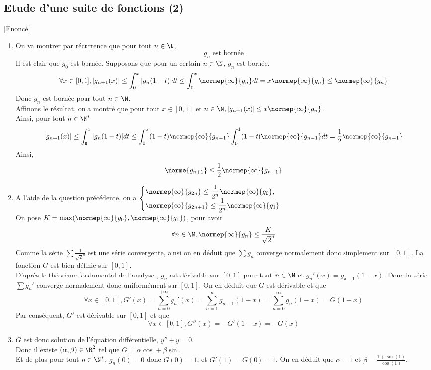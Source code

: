 \documentclass{book}
\begin{document}
	\subsection{Etude d'une suite de fonctions (2)}\label{sec:etude-dune-suite-de-fonction-2}
		\textcolor{blue}{\hyperref[Etude d'une suite de fonctions 2]{[Enoncé]}}\\
	\begin{enumerate}[leftmargin=*]
		\item On va montrer par récurrence que pour tout $n\in\N$, 
		\[g_n \text{ est bornée}\]
		Il est clair que $g_0$ est bornée.
		Supposons que pour un certain $n\in\N$, $g_n$ est bornée.\\
		\[\forall x\in [0,1], |g_{n+1}(x)|\leq\int_{0}^{x}|g_{n}(1-t)|dt\leq\int_{0}^{x}\normep{\infty}{g_n}dt=x\normep{\infty}{g_n}\leq \normep{\infty}{g_n}\]
		Donc $g_n$ est bornée pour tout $n\in \N$.\\
		Affinons le résultat, on a montré que pour tout $x\in [0,1]$ et $n\in\N, |g_{n+1}(x)|\leq x\normep{\infty}{g_n}$.\\
		Ainsi, pour tout $n\in\N^*$
		\[|g_{n+1}(x)|\leq\int_{0}^{x}|g_n(1-t)|dt\leq\int_{0}^{x}(1-t)\normep{\infty}{g_{n-1}}\int_{0}^{1}(1-t)\normep{\infty}{g_{n-1}}dt=\frac{1}{2}\normep{\infty}{g_{n-1}}\]
		Ainsi, \[\norme{g_{n+1}}\leq \frac{1}{2}\normep{\infty}{g_{n-1}}\]
		\item A l'aide de la question précédente, on a $\begin{cases}
		\displaystyle	\normep{\infty}{g_{2n}}\leq \frac{1}{2^n}\normep{\infty}{g_0},\\
		\displaystyle 	\normep{\infty}{g_{2n+1}}\leq \frac{1}{2^n}\normep{\infty}{g_1}
		\end{cases}$\\
		On pose $K=\max(\normep{\infty}{g_0}, \normep{\infty}{g_1})$, pour avoir \[\forall n\in\N, \normep{\infty}{g_n}\leq\frac{K}{\sqrt{2}^n}\]
		Comme la série $\displaystyle\sum \frac{1}{\sqrt{2}^n}$ est une série convergente, ainsi on en déduit que $\displaystyle\sum g_n$ converge normalement donc simplement sur $[0,1]$. La fonction $G$ est bien définie sur $[0,1]$.\\
		D'après le théorème fondamental de l'analyse , $g_n$ est dérivable sur $[0,1]$ pour tout $n\in \N$ et $g_n'(x)=g_{n-1}(1-x)$.
		Donc la série $\displaystyle \sum g_n'$ converge normalement donc uniformément sur $[0,1]$. On en déduit que $G$ est dérivable et que 
		\[\forall x\in [0,1], G'(x)=\sum_{n=0}^{+\infty}g_n'(x)=\sum_{n=1}^{\infty}g_{n-1}(1-x)=\sum_{n=0}^{\infty}g_n(1-x)=G(1-x)\]
		Par conséquent, $G'$ est dérivable sur $[0,1]$ et que 
		\[\forall x\in [0,1], G''(x)=-G'(1-x)=-G(x)\]
		\item $G$ est donc solution de l'équation différentielle, $y''+y=0$.\\
		Donc il existe $(\alpha, \beta)\in\R^2$ tel que $G=\alpha \cos+\beta \sin$.\\
		Et de plus pour tout $n\in\N^*$, $g_n(0)=0$ donc $G(0)=1$, et $G'(1)=G(0)=1$. On en déduit que $\alpha=1$ et $\displaystyle\beta=\frac{1+\sin(1)}{\cos(1)}$. 
	\end{enumerate}
\end{document}

